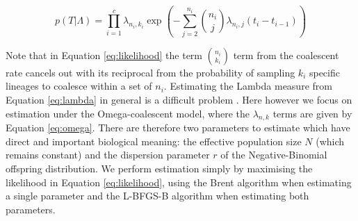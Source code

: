 \documentclass{article}
\renewcommand{\eqref}[1]{\ref{#1}}
\begin{document}
\begin{equation}
p(T|\Lambda)=\prod_{i=1}^{c}\lambda_{n_i,k_i}\exp\left(-\sum_{j=2}^{n_i}\binom{n_i}{j}\lambda_{n_i,j}(t_i-t_{i-1})\right)
\label{eq:likelihood}
\end{equation}

Note that in Equation \eqref{eq:likelihood} the term $\binom{n_i}{k_i}$  term from the
coalescent rate cancels out with its reciprocal from the probability of sampling $k_i$ specific
lineages to coalesce within a set of $n_i$.
Estimating the Lambda measure from Equation \eqref{eq:lambda} 
in general is a difficult problem
\citep{Koskela2018a,miropinaEstimatingLambdaMeasure2023}.
Here however we focus on estimation under the Omega-coalescent model,
where the $\lambda_{n,k}$ terms are given by Equation \eqref{eq:omega}.
There are therefore two parameters to estimate which have direct and important 
biological meaning:
the effective population size $N$ (which remains constant) and the dispersion
parameter $r$ of the Negative-Binomial offspring distribution. 
We perform estimation simply by maximising the likelihood in Equation \eqref{eq:likelihood},
using the Brent algorithm \citep{brent1971algorithm} when estimating a single parameter
and the L-BFGS-B algorithm \citep{byrd1995limited} when estimating both parameters.
\end{document}
